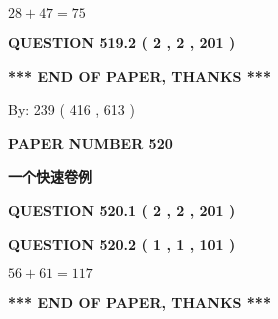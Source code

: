 \documentclass{ctexart}
\begin{document}
  
 
 

$ %
28 +  %
47=   %
75$
 
 
  
\vspace{0.2in}
  
{\textbf{\Large{QUESTION
519.2 
 ( 2 , 2 , 201 )
}}}
  
  
   
   
 \vspace{0.2in}
 
   
   
   
   
\vspace{1.0in} 
{\textbf{\large{ *** END OF PAPER, THANKS *** }}} 
   
   
\hspace{1.0in} By: 
 239 ( 416 ,  613 )
   
   
   
   
\newpage 
\setcounter{page}{ 
   520001 } 
   
   
   
   
 {\textbf{ \Large{ PAPER NUMBER  520  }}}
   
   
\vspace{0.2in}
   
   
   
   
   
   
 \vspace{0.2in}
{\LARGE {\textbf{ 一个快速卷例}}}
   
   
  
\vspace{0.2in}
  
{\textbf{\Large{QUESTION
520.1 
 ( 2 , 2 , 201 )
}}}
  
  
  
\vspace{0.2in}
  
{\textbf{\Large{QUESTION
520.2 
 ( 1 , 1 , 101 )
}}}
  
  
 
 

$ %
56 +  %
61=   %
117$
 
 
   
   
 \vspace{0.2in}
 
   
   
   
   
\vspace{1.0in} 
{\textbf{\large{ *** END OF PAPER, THANKS *** }}} 
   
\end{document}
